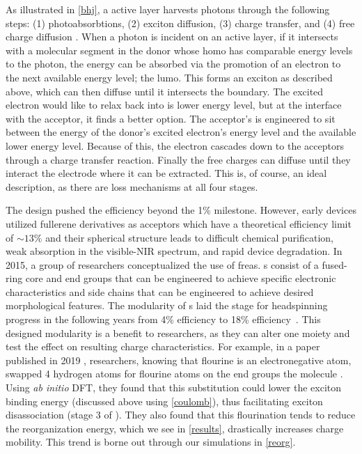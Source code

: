 As illustrated in \ref{bhj}, a  active layer harvests photons through the following 
steps: (1) photoabsorbtions, 
(2) exciton diffusion, (3) charge transfer, and (4) free charge diffusion \cite{Fusella2019}. 
When a photon is incident on
an  active layer, if it intersects with a molecular segment in the donor whose 
\gls{homo} has comparable energy levels to the photon, 
the energy can be absorbed via the promotion of
an electron to the next available energy level; the \gls{lumo}.
This forms an exciton as
described above, which can then diffuse until it intersects the boundary. 
The excited electron would like to relax
back into is lower energy level, but at the interface with the acceptor, it finds a better option. 
The acceptor's  is engineered to sit between the energy of the donor's excited electron's energy level and the
available lower energy level. Because of this, the electron cascades down to the acceptors  through a charge
transfer reaction. Finally the free charges can diffuse until they interact the electrode where it can be
extracted. This is, of course, an ideal description, as there are loss mechanisms at all four stages. 

The  design pushed the efficiency beyond the 1\% milestone. However, early  devices utilized
fullerene derivatives as acceptors which have a theoretical efficiency limit of $\sim13\%$ \cite{Scharber2016}
and their spherical
structure leads to difficult chemical purification, weak absorption in the visible-NIR spectrum, and rapid
device degradation. In 2015, a group of researchers conceptualized the use of
\gls{frea}s. s consist of
a fused-ring core and end groups that can be engineered to achieve specific electronic characteristics and side
chains that can be engineered to achieve desired morphological features. The modularity of s
laid the stage for headspinning progress in the following years from 4\% efficiency to 18\% 
efficiency~\cite{Wang2021a}. 
This designed modularity is a benefit to researchers, as they can alter one moiety and test
the effect on resulting charge characteristics. For example, in a paper published in 2019 \cite{Benatto2019},
researchers, knowing that flourine is an electronegative atom, swapped 4 hydrogen atoms for flourine atoms on
the end groups the  molecule . Using \textit{ab initio} DFT, they found 
that this substitution could lower the exciton
binding energy (discussed above using \autoref{coulomb}), thus facilitating exciton disassociation (stage 3 of
). They also found
that this flourination tends to reduce the reorganization energy, which we see
in \autoref{results}, drastically increases charge mobility. This trend is borne out through our
simulations in \autoref{reorg}.

